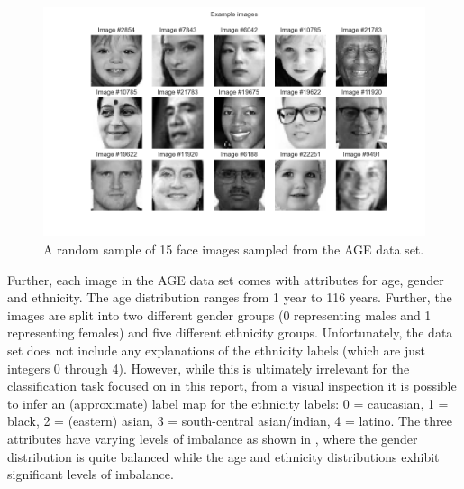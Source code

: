 \documentclass{article}
\begin{document}
\begin{figure}
  \centering
  \includegraphics[width=\textwidth]{imgs/random_face_images.png}
  \caption{A random sample of 15 face images sampled from the AGE data set.}
  \label{fig:randomfaces}
\end{figure}

Further, each image in the AGE data set comes with attributes for age, gender and ethnicity. The age distribution ranges from 1 year to 116 years. Further, the images are split into two different gender groups (0 representing males and 1 representing females) and five different ethnicity groups. Unfortunately, the data set does not include any explanations of the ethnicity labels (which are just integers 0 through 4). However, while this is ultimately irrelevant for the classification task focused on in this report, from a visual inspection it is possible to infer an (approximate) label map for the ethnicity labels: 0 = caucasian, 1 = black, 2 = (eastern) asian, 3 = south-central asian/indian, 4 = latino. The three attributes have varying levels of imbalance as shown in , where the gender distribution is quite balanced while the age and ethnicity distributions exhibit significant levels of imbalance.
\end{document}
